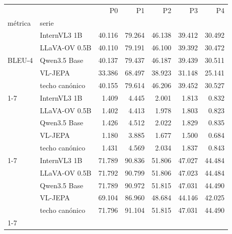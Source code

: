 \begin{tabular}{llrrrrr}
\toprule
 &  & P0 & P1 & P2 & P3 & P4 \\
métrica & serie &  &  &  &  &  \\
\midrule
\multirow[t]{5}{*}{BLEU-4} & InternVL3 1B & 40.116 & 79.264 & 46.138 & 39.412 & 30.492 \\
 & LLaVA-OV 0.5B & 40.110 & 79.191 & 46.100 & 39.392 & 30.472 \\
 & Qwen3.5 Base & 40.137 & 79.437 & 46.187 & 39.439 & 30.511 \\
 & VL-JEPA & 33.386 & 68.497 & 38.923 & 31.148 & 25.141 \\
 & techo canónico & 40.155 & 79.614 & 46.206 & 39.452 & 30.527 \\
\cline{1-7}
\multirow[t]{5}{*}{CIDEr-D} & InternVL3 1B & 1.409 & 4.445 & 2.001 & 1.813 & 0.832 \\
 & LLaVA-OV 0.5B & 1.402 & 4.413 & 1.978 & 1.803 & 0.823 \\
 & Qwen3.5 Base & 1.426 & 4.512 & 2.022 & 1.829 & 0.835 \\
 & VL-JEPA & 1.180 & 3.885 & 1.677 & 1.500 & 0.684 \\
 & techo canónico & 1.431 & 4.569 & 2.034 & 1.837 & 0.843 \\
\cline{1-7}
\multirow[t]{5}{*}{ROUGE-L} & InternVL3 1B & 71.789 & 90.836 & 51.806 & 47.027 & 44.484 \\
 & LLaVA-OV 0.5B & 71.792 & 90.799 & 51.806 & 47.023 & 44.484 \\
 & Qwen3.5 Base & 71.789 & 90.972 & 51.815 & 47.031 & 44.490 \\
 & VL-JEPA & 69.104 & 86.960 & 48.684 & 44.146 & 42.025 \\
 & techo canónico & 71.796 & 91.104 & 51.815 & 47.031 & 44.490 \\
\cline{1-7}
\bottomrule
\end{tabular}
